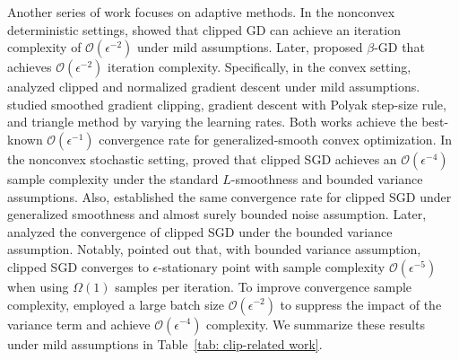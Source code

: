 \documentclass[10pt]{article} %
\begin{document}
Another series of work focuses on adaptive methods. In the nonconvex deterministic settings, \citet{zhang2020gradientclippingacceleratestraining,genralclip,petergensmooth,L0L1newstudy} showed that clipped GD can achieve an iteration complexity of $\mathcal{O}(\epsilon^{-2})$ under mild assumptions. Later, \citet{pmlr-v202-chen23ar} proposed $\beta$-GD that achieves $\mathcal{O}(\epsilon^{-2})$ iteration complexity. Specifically, in the convex setting, \citet{L0L1newstudy} analyzed clipped and normalized gradient descent under mild assumptions. \citet{petergensmooth} studied smoothed gradient clipping, gradient descent with Polyak step-size rule, and triangle method by varying the learning rates. Both works achieve the best-known $\mathcal{O}({\epsilon}^{-1})$ convergence rate for generalized-smooth convex optimization. In the nonconvex stochastic setting, \citet{zhangLsmoothclip} proved that clipped SGD achieves an $\mathcal{O}(\epsilon^{-4})$ sample complexity under the standard $L$-smoothness and bounded variance assumptions. Also, \citet{zhang2020gradientclippingacceleratestraining} established the same convergence rate for clipped SGD under generalized smoothness and almost surely bounded noise assumption. Later, \citet{reisizadeh2023variancereducedclippingnonconvexoptimization, usitchclip} analyzed the convergence of clipped SGD under the bounded variance assumption. Notably, \citet{usitchclip} pointed out that, with bounded variance assumption, clipped SGD converges to $\epsilon$-stationary point with sample complexity $\mathcal{O}(\epsilon^{-5})$ when using $\Omega(1)$ samples per iteration. To improve convergence sample complexity, \citet{reisizadeh2023variancereducedclippingnonconvexoptimization} employed a large batch size $\mathcal{O}(\epsilon^{-2})$ to suppress the impact of the variance term and achieve $\mathcal{O}(\epsilon^{-4})$ complexity. We summarize these results under mild assumptions in Table~\ref{tab: clip-related work}. 
\end{document}
